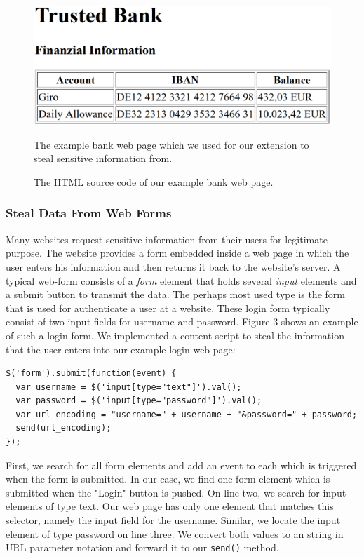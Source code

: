 \documentclass[article,colorback,accentcolor=tud9c,type=bsc]{tudthesis}
\let\stdsubsubsection\subsubsection
\renewcommand\subsubsection{\newpage\stdsubsubsection}
\begin{document}
	\begin{figure}[hb]
		\includegraphics[scale=0.3]{lib/bank.png}
		\caption[Example bank web page]{The example bank web page which we used for our extension to steal sensitive information from.}		
		
		\caption[Example bank web page as HTML]{The HTML source code of our example bank web page.}
	\end{figure}

\subsubsection{Steal Data From Web Forms}

	Many websites request sensitive information from their users for legitimate purpose. The website provides a form embedded inside a web page in which the user enters his information and then returns it back to the website's server. A typical web-form consists of a \textit{form} element that holds several \textit{input} elements and a submit button to transmit the data. The perhaps most used type is the form that is used for authenticate a user at a website. These login form typically consist of two input fields for username and password. Figure 3 shows an example of such a login form. We implemented a content script to steal the information that the user enters into our example login web page: \\
	
	\begin{lstlisting}
$('form').submit(function(event) {
  var username = $('input[type="text"]').val();
  var password = $('input[type="password"]').val();
  var url_encoding = "username=" + username + "&password=" + password;
  send(url_encoding);
});
	\end{lstlisting}
	
	First, we search for all form elements and add an event to each which is triggered when the form is submitted. In our case, we find one form element which is submitted when the "Login" button is pushed. On line two, we search for input elements of type text. Our web page has only one element that matches this selector, namely the input field for the username. Similar, we locate the input element of type password on line three. We convert both values to an string in URL parameter notation and forward it to our \texttt{send()} method. \\
	
\end{document}
